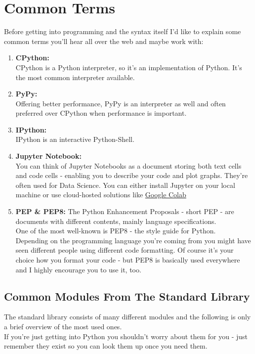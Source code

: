 \section{Common Terms}
    Before getting into programming and the syntax itself I'd like to explain some common terms you'll hear all over the web and maybe work with:
    \begin{enumerate}
        \item \textbf{CPython:}\\
            CPython is a Python interpreter, so it's an implementation of Python.
            It's the most common interpreter available.
        \item \textbf{PyPy:}\\
            Offering better performance, PyPy is an interpreter as well and often preferred over CPython when performance is important.
        \item \textbf{IPython:}\\
            IPython is an interactive Python-Shell.
        \item \textbf{Jupyter Notebook:}\\
            You can think of Jupyter Notebooks as a document storing both text cells and code cells - enabling you to describe your code and plot graphs. They're often used for Data Science.
            You can either install Jupyter on your local machine or use cloud-hosted solutions like \href{https://colab.research.google.com/}{Google Colab}
        \item \textbf{PEP \& PEP8:}
            The Python Enhancement Proposals - short PEP - are documents with different contents, mainly language specifications.\\
            One of the most well-known is PEP8 - the style guide for Python.\\
            Depending on the programming language you're coming from you might have seen different people using different code formatting.
            Of course it's your choice how you format your code - but PEP8 is basically used everywhere and I highly encourage you to use it, too.
        \end{enumerate}
        
    \subsection{Common Modules From The Standard Library}
        The standard library consists of many different modules and the following is only a brief overview of the most used ones.\\
        If you're just getting into Python you shouldn't worry about them for you - just remember they exist so you can look them up once you need them.
        
